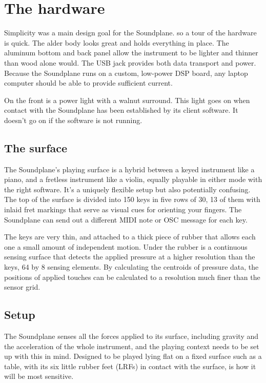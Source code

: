 \setcounter{secnumdepth}{0}

\chapter{The hardware}

Simplicity was a main design goal for the Soundplane. so a tour of the hardware is quick.  The alder body looks great and holds everything in place.  The aluminum bottom and back panel allow the instrument to be lighter and thinner than wood alone would.  The USB jack provides both data transport and power.  Because the Soundplane runs on a custom, low-power DSP board, any laptop computer should be able to provide sufficient current.

On the front is a power light with a walnut surround.  This light goes on when contact with the Soundplane has been established by its client software.  It doesn't go on if the software is not running.  

\section{The surface}

The Soundplane’s playing surface is a hybrid between a keyed instrument like a piano, and a fretless instrument like a violin, equally playable in either mode with the right software.  It's a uniquely flexible setup but also potentially confusing.  The top of the surface is divided into 150 keys in five rows of 30, 13 of them with inlaid fret markings that serve as visual cues for orienting your fingers.  The Soundplane can send out a different MIDI note or OSC message for each key.  

The keys are very thin, and attached to a thick piece of rubber that allows each one a small amount of independent motion.  Under the rubber is a continuous sensing surface that detects the applied pressure at a higher resolution than the keys, 64 by 8 sensing elements.  By calculating the centroids of pressure data, the positions of applied touches can be calculated to a resolution much finer than the sensor grid.  

\section{Setup}

The Soundplane senses all the forces applied to its surface, including gravity and the acceleration of the whole instrument, and the playing context needs to be set up with this in mind.  Designed to be played lying flat on a fixed surface such as a table, with its six little rubber feet (LRFs) in contact with the surface, is how it will be most sensitive.  

